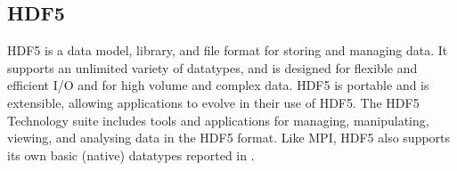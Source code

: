 \subsection{HDF5}


HDF5 is a data model, library, and file format for storing and managing data. It supports an unlimited variety of datatypes, and is designed for flexible and efficient I/O and for high volume and complex data.
HDF5 is portable and is extensible, allowing applications to evolve in their use of HDF5.
The HDF5 Technology suite includes tools and applications for managing, manipulating, viewing, and analysing data in the HDF5 format. Like MPI, HDF5 also supports its own basic (native) datatypes reported in .

